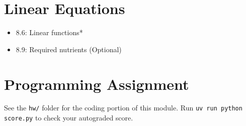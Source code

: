 \documentclass[12pt]{article}
\theoremstyle{definition}
\begin{document}
\section{Linear Equations}
\begin{itemize}
    \item 8.6: Linear functions*
    \item 8.9: Required nutrients (Optional)
\end{itemize}

\section{Programming Assignment}

See the \texttt{hw/} folder for the coding portion of this module.
Run \texttt{uv run python score.py} to check your autograded score.
\end{document}
